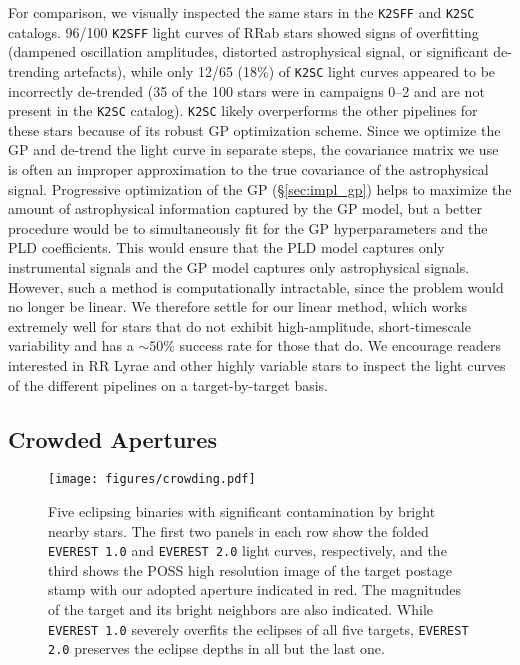 \documentclass[]{emulateapj}
\newcommand{\edited}[1]{{\color{red} #1}}
\begin{document}
For comparison, we visually inspected the same stars in the \texttt{K2SFF} and \texttt{K2SC}
catalogs. 96/100 \texttt{K2SFF} light curves of RRab stars showed signs of overfitting
(dampened oscillation amplitudes, distorted astrophysical signal,
or significant de-trending artefacts), while only 12/65 (18\%) of \texttt{K2SC} light curves
appeared to be incorrectly de-trended (35 of the 100 stars were in campaigns 0--2 and are
not present in the \texttt{K2SC} catalog). \texttt{K2SC} likely overperforms the other
pipelines for these stars because of its robust GP optimization scheme. Since we optimize
the GP and de-trend the light curve in separate steps, the covariance matrix we use is often
an improper approximation to the true covariance of the astrophysical signal. Progressive
optimization of the GP (\S\ref{sec:impl_gp}) helps to maximize the amount of astrophysical
information captured by the GP model, but a better procedure would be to simultaneously
fit for the GP hyperparameters and the PLD coefficients. This would ensure that the PLD
model captures only instrumental signals and the GP model captures only astrophysical
signals. However, such a method is computationally intractable, since the problem would
no longer be linear. We therefore settle for our linear method, which works extremely
well for stars that do not exhibit \edited{high-amplitude, short-timescale} variability and has a ${\sim}50\%$ success
rate for those that do. We encourage readers interested in RR Lyrae and other
\edited{highly variable} stars to inspect the light curves of the different pipelines on a target-by-target
basis.

\subsection{Crowded Apertures}
\label{sec:crowded}

\begin{figure}[hbt]
  \begin{center}
      \texttt{[image: figures/crowding.pdf]}
      \vspace*{-0.5in}
       \caption{Five eclipsing binaries with significant contamination by bright nearby stars. The first
       two panels in each row show the folded \texttt{EVEREST 1.0} and \texttt{EVEREST 2.0} light curves, respectively,
       and the third shows the POSS high resolution image of
       the target postage stamp with our adopted aperture indicated in red. The magnitudes of the target
       and its bright neighbors are also indicated. While \texttt{EVEREST 1.0} severely overfits the eclipses of
       all five targets, \texttt{EVEREST 2.0} preserves the eclipse depths in all but the last one.}
     \label{fig:crowding}
  \end{center}
\end{figure}
\end{document}
